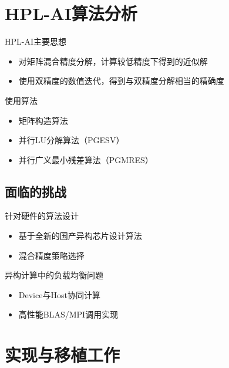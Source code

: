 \documentclass[
    fontset=fandol,
    xcolor=svgnames %
]{ctexbeamer}
\begin{document}
\section{HPL-AI算法分析}
\begin{frame}
    \begin{block}{HPL-AI主要思想}
        \begin{itemize}
            \item 对矩阵混合精度分解，计算较低精度下得到的近似解
            \item 使用双精度的数值迭代，得到与双精度分解相当的精确度
        \end{itemize}
    \end{block}
    \begin{block}{使用算法}
        \begin{itemize}
            \item 矩阵构造算法
            \item 并行LU分解算法（PGESV）
            \item 并行广义最小残差算法（PGMRES）
        \end{itemize}
    \end{block}
\end{frame}
\subsection{面临的挑战}
\begin{frame}
    \begin{block}{针对硬件的算法设计}
        \begin{itemize}
            \item 基于全新的国产异构芯片设计算法
            \item 混合精度策略选择
        \end{itemize}
    \end{block}
    \begin{block}{异构计算中的负载均衡问题}
        \begin{itemize}
            \item Device与Host协同计算
            \item 高性能BLAS/MPI调用实现
        \end{itemize}
    \end{block}
\end{frame}

\section{实现与移植工作}
\end{document}
